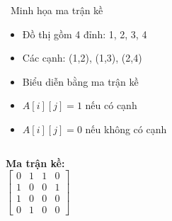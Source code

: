 \documentclass{beamer}
\begin{document}
\begin{frame}{\faTable\ Minh họa ma trận kề}
\begin{tcolorbox}
\begin{itemize}
\item Đồ thị gồm 4 đỉnh: 1, 2, 3, 4
\item Các cạnh: (1,2), (1,3), (2,4)
\item Biểu diễn bằng ma trận kề
\item $A[i][j] = 1$ nếu có cạnh
\item $A[i][j] = 0$ nếu không có cạnh
\end{itemize}
\end{tcolorbox}

\vspace{0.3cm}

\begin{columns}

\centering
{}

\begin{tcolorbox}[colframe=softpurple!70!black]
\textbf{Ma trận kề:}
\[
\begin{bmatrix}
0 & 1 & 1 & 0 \\
1 & 0 & 0 & 1 \\
1 & 0 & 0 & 0 \\
0 & 1 & 0 & 0
\end{bmatrix}
\]
\end{tcolorbox}

\end{columns}

\end{frame}
\end{document}
